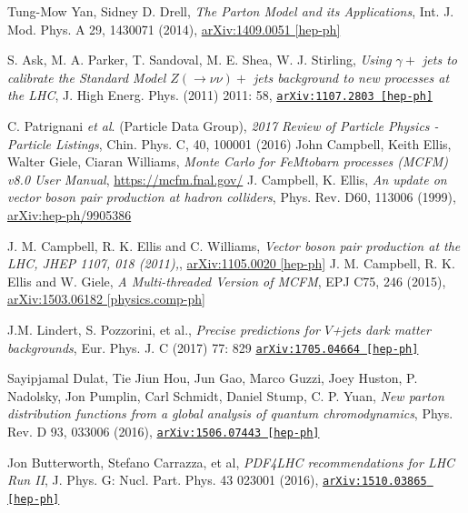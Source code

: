 \documentclass[12pt,a4paper,openright,twoside]{report}
\newcommand{\bibref}[4]{#1, \textit{#2}, #3 #4}
\begin{document}
\begin{thebibliography}{9}
	\bibref{Tung-Mow Yan, Sidney D. Drell}{The Parton Model and its Applications}{Int. J. Mod. Phys. A 29, 1430071 (2014),}{\href{https://arxiv.org/abs/1409.0051}{arXiv:1409.0051 [hep-ph]}}
	
	\bibref{S. Ask, M. A. Parker, T. Sandoval, M. E. Shea, W. J. Stirling}{Using $\gamma +$ jets to calibrate the Standard Model $Z(\rightarrow \nu\nu)+$ jets background to new processes at the LHC}{J. High Energ. Phys. (2011) 2011: 58,}
{\href{https://arxiv.org/abs/1107.2803}{\texttt{arXiv:1107.2803 [hep-ph]}}}

	\bibref{C. Patrignani \textit{et al}. (Particle Data Group)}{2017 Review of Particle Physics - Particle Listings}{Chin. Phys. C, 40, 100001 (2016)}

	\bibref{John Campbell, Keith Ellis, Walter Giele, Ciaran Williams}{Monte Carlo for FeMtobarn processes (MCFM) v8.0 User Manual}{\url{https://mcfm.fnal.gov/}}
	
	\bibref{J. Campbell, K. Ellis}{An update on vector boson pair production at hadron colliders}{Phys. Rev. D60, 113006 (1999),}{\href{https://arxiv.org/abs/hep-ph/9905386}{arXiv:hep-ph/9905386}}

	\bibref{J. M. Campbell, R. K. Ellis and C. Williams}{Vector boson pair production at the LHC, JHEP 1107, 018 (2011),}{\href{https://arxiv.org/abs/1105.0020}{arXiv:1105.0020 [hep-ph]}}

	\bibref{J. M. Campbell, R. K. Ellis and W. Giele}{A Multi-threaded Version of MCFM}{EPJ C75, 246 (2015),}{\href{https://arxiv.org/abs/1503.06182}{arXiv:1503.06182 [physics.comp-ph]}}

	\bibref{J.M. Lindert, S. Pozzorini, et al.}{Precise predictions for $V$+jets dark matter backgrounds}{Eur. Phys. J. C (2017) 77: 829}{\href{https://arxiv.org/abs/1705.04664}{\texttt{arXiv:1705.04664 [hep-ph]}}}
	
	\bibref{Sayipjamal Dulat, Tie Jiun Hou, Jun Gao, Marco Guzzi, Joey Huston, P. Nadolsky, Jon Pumplin, Carl Schmidt, Daniel Stump, C. P. Yuan}{New parton distribution functions from a global analysis of quantum chromodynamics}{Phys. Rev. D 93, 033006 (2016),}{\href{https://arxiv.org/abs/1506.07443}{\texttt{arXiv:1506.07443 [hep-ph]}}}

	\bibref{Jon Butterworth, Stefano Carrazza, et al}{PDF4LHC recommendations for LHC Run II}{J. Phys. G: Nucl. Part. Phys. 43 023001 (2016),}{\href{https://arxiv.org/abs/1510.03865}{\texttt{arXiv:1510.03865 [hep-ph]}}}


\end{thebibliography}
\end{document}

